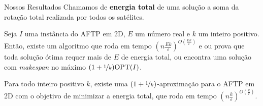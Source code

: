 \begin{frame}{Nossos Resultados}
  Chamamos de \textbf{energia total} de uma solução a soma da rotação total realizada por todos os satélites.

  \pause

  \begin{thm}
    Seja $I$ uma instância do AFTP em 2D, $E$ um número real e $k$ um inteiro positivo.
    Então, existe um algoritmo que roda em tempo ${(n\frac{Ek}{\varepsilon})^{O(\frac{Ek}{\varepsilon})}}$ e ou prova que toda solução ótima requer mais de $E$ de energia total, ou encontra uma solução com \emph{makespan} no máximo ${(1+\nicefrac{1}{k})\text{OPT}(I)}$.
  \end{thm}

  \pause

  \begin{thm}
    Para todo inteiro positivo $k$, existe uma \mbox{$(1+\nicefrac{1}{k})$-aproximação} para o AFTP em 2D com o objetivo de minimizar a energia total, que roda em tempo \mbox{$(n\frac{k}{\varepsilon})^{O(\frac{k}{\varepsilon})}$}.
  \end{thm}
\end{frame}
